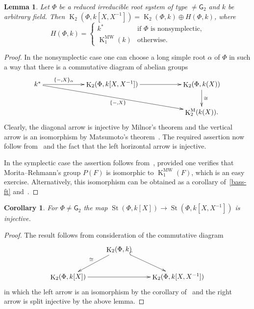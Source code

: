 \documentclass[oneside, 10pt]{amsart}
\newtheorem{corollary}{Corollary}
\newtheorem{lemma}{Lemma}
\theoremstyle{remark}
\theoremstyle{definition}
\DeclareMathOperator{\St}{St}
\DeclareMathOperator{\K}{K}
\newcommand{\rG}{\mathsf{G}}
\numberwithin{equation}{section}
\begin{document}
\begin{lemma} Let $\Phi$ be a reduced irreducible root system of type $\neq \rG_2$ and $k$ be arbitrary field.
Then $\K_2(\Phi, k[X, X^{-1}]) = \K_2(\Phi, k) \oplus H(\Phi, k)$, where
\[ H(\Phi, k) = \left\{\begin{array}{ll} k^* & \text{if $\Phi$ is nonsymplectic,} \\ \K_1^\mathrm{MW}(k)& \text{otherwise.}  \end{array}\right. \]  \end{lemma}
\begin{proof} In the nonsymplectic case one can choose a long simple root $\alpha$ of $\Phi$ in such a way that there is a commutative diagram of abelian groups
\[\xymatrixcolsep{5pc}\xymatrix{k^* \ar[r]^-{\{ -, X \}_{\alpha}} \ar[rrd]_{\{-, X\}} & \K_2(\Phi, k[X, X^{-1}]) \ar[r] & \K_2(\Phi, k(X)) \ar[d]^{\cong} \\
                                                                                      &                                 & \K_2^\mathrm{M}(k(X)).} \]
Clearly, the diagonal arrow is injective by Milnor's theorem and the vertical arrow is an isomorphism by Matsumoto's theorem~\cite[Theorem~5.10]{Ma69}.
The required assertion now follow from~\cite[Satz~3]{Hur77} and the fact that the left horizontal arrow is injective.

In the symplectic case the assertion follows from~\cite[Theorem~B]{MR91}, provided one verifies that Morita--Rehmann's group $P(F)$ is isomorphic to $\K_1^\mathrm{MW}(F)$,
 which is an easy exercise. Alternatively, this isomorphism can be obtained as a corollary of~\cref{bass-ft} and~\cite[Lemma~4.1.1]{AF17}. \end{proof}
 
\begin{corollary} \label{field-injectivity} For $\Phi\neq\rG_2$ the map $\St(\Phi, k[X]) \to \St(\Phi, k[X, X^{-1}])$ is injective. \end{corollary}
\begin{proof} The result follows from consideration of the commutative diagram
\[\xymatrix{ & \K_2(\Phi, k) \ar[dl]_{\cong} \ar@{^{(}->}[dr] & \\
               \K_2(\Phi, k[X]) \ar[rr] &               & \K_2(\Phi, k[X, X^{-1}])} \]
in which the left arrow is an isomorphism by the corollary of~\cite[Satz~1]{Re75} and the right arrow is split injective by the above lemma. \end{proof}
\end{document}
